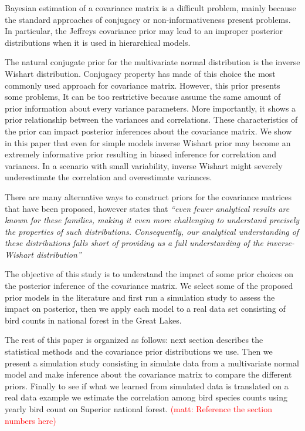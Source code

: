 \documentclass[a4paper]{article}
\newcommand{\matt}[1]{\textcolor{red}{(matt: #1)}}
\begin{document}
Bayesian estimation of a covariance matrix is a difficult problem, mainly because the standard approaches of conjugacy or non-informativeness present problems. In particular, the  Jeffreys covariance prior may lead to an improper posterior distributions when it is used in hierarchical models.  

The natural conjugate prior for the multivariate normal distribution is the inverse Wishart distribution. Conjugacy property has made of this choice the most commonly used approach for covariance matrix. However, this prior presents some problems, It can be too restrictive because assume the same amount of prior information about every variance parameters. %
 More importantly, it shows a prior relationship between the variances and correlations. These characteristics of the prior can impact posterior inferences about the covariance matrix. We show in this paper that even for simple models inverse Wishart prior may become an extremely informative prior resulting in biased inference for correlation and variances. In a scenario with small variability, inverse Wishart might severely underestimate the correlation and overestimate variances. %

There are many alternative ways to construct priors for the covariance matrices that have been proposed,  however \cite{visualize} states that 
 \textit{``even fewer analytical results are known for these families, making it even more challenging to understand precisely the properties of such distributions. Consequently, our analytical understanding of these distributions falls short of providing us a full understanding of the inverse-Wishart distribution'' }
 
The objective of this study is to understand the impact of some prior choices on the posterior inference of the covariance matrix. We select some of the proposed prior models in the literature and first run a simulation study to assess the impact on posterior, then we apply each model to a real data set consisting of bird counts in national forest in the Great Lakes. 

The rest of this paper is organized as follows: next section describes the statistical methods and the covariance prior distributions we use. Then we present a simulation study consisting in simulate data from a multivariate normal model and make inference about the covariance matrix to compare the different priors. Finally to see if what we learned from simulated data is translated on a real data example we estimate the correlation among bird species counts using yearly bird count on Superior national forest. \matt{Reference the section numbers here}
\end{document}
